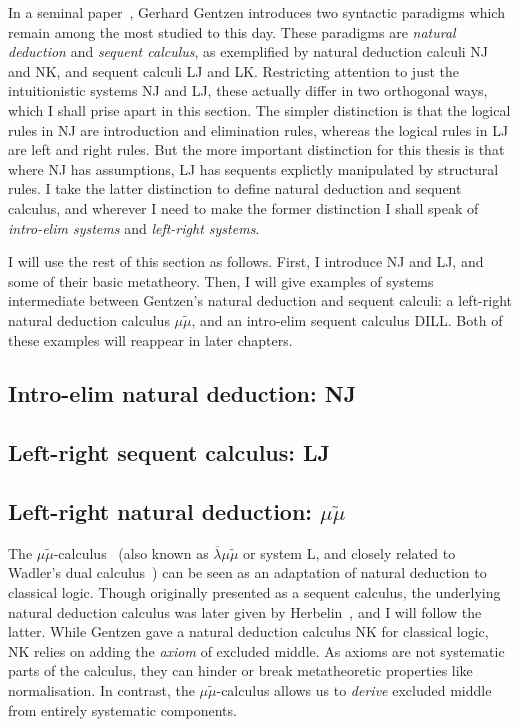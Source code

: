 In a seminal paper~\cite{Gentzen64}, Gerhard Gentzen introduces two syntactic
paradigms which remain among the most studied to this day.
These paradigms are \emph{natural deduction} and \emph{sequent calculus}, as
exemplified by natural deduction calculi NJ and NK, and sequent calculi LJ and
LK.
Restricting attention to just the intuitionistic systems NJ and LJ, these
actually differ in two orthogonal ways, which I shall prise apart in this
section.
The simpler distinction is that the logical rules in NJ are introduction and
elimination rules, whereas the logical rules in LJ are left and right rules.
But the more important distinction for this thesis is that where NJ has
assumptions, LJ has sequents explictly manipulated by structural rules.
I take the latter distinction to define natural deduction and sequent calculus,
and wherever I need to make the former distinction I shall speak of
\emph{intro-elim systems} and \emph{left-right systems}.

I will use the rest of this section as follows.
First, I introduce NJ and LJ, and some of their basic metatheory.
Then, I will give examples of systems intermediate between Gentzen's natural
deduction and sequent calculi: a left-right natural deduction calculus
$\mu\tilde\mu$, and an intro-elim sequent calculus DILL\@.
Both of these examples will reappear in later chapters.

\subsection{Intro-elim natural deduction: NJ}

\subsection{Left-right sequent calculus: LJ}

\subsection{Left-right natural deduction: $\mu\tilde\mu$}
The $\mu\tilde\mu$-calculus~\cite{CH00} (also known as
$\overline\lambda\mu\tilde\mu$ or system L, and closely related to Wadler's
dual calculus~\cite{Wadler03}) can be seen as an adaptation of natural deduction
to classical logic.
Though originally presented as a sequent calculus, the underlying natural
deduction calculus was later given by Herbelin~\cite[p.\ 12]{Herbelin-hab}, and
I will follow the latter.
While Gentzen gave a natural deduction calculus NK for classical logic, NK
relies on adding the \emph{axiom} of excluded middle.
As axioms are not systematic parts of the calculus, they can hinder or break
metatheoretic properties like normalisation.
In contrast, the $\mu\tilde\mu$-calculus allows us to \emph{derive} excluded
middle from entirely systematic components.

